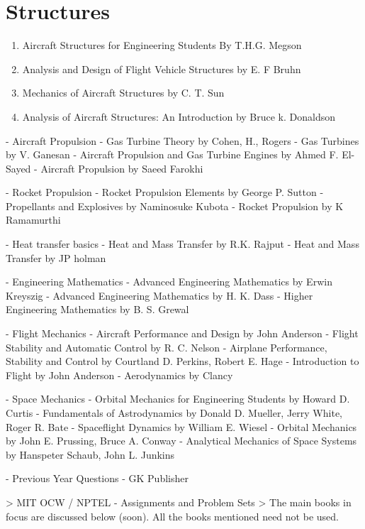 \section{Structures}
\begin{enumerate}
  \item Aircraft Structures for Engineering Students By T.H.G. Megson
  \item Analysis and Design of Flight Vehicle Structures by E. F Bruhn
  \item Mechanics of Aircraft Structures by C. T. Sun
  \item Analysis of Aircraft Structures: An Introduction by Bruce k. Donaldson
\end{enumerate}

- Aircraft Propulsion
- Gas Turbine Theory by Cohen, H., Rogers
- Gas Turbines by V. Ganesan
- Aircraft Propulsion and Gas Turbine Engines by Ahmed F. El-Sayed
- Aircraft Propulsion by Saeed Farokhi

- Rocket Propulsion
- Rocket Propulsion Elements by George P. Sutton
- Propellants and Explosives by Naminosuke Kubota
- Rocket Propulsion by K Ramamurthi

- Heat transfer basics
- Heat and Mass Transfer by R.K. Rajput
- Heat and Mass Transfer by JP holman

- Engineering Mathematics
- Advanced Engineering Mathematics by Erwin Kreyszig
- Advanced Engineering Mathematics by H. K. Dass
- Higher Engineering Mathematics by B. S. Grewal

- Flight Mechanics
- Aircraft Performance and Design by John Anderson
- Flight Stability and Automatic Control by R. C. Nelson
- Airplane Performance, Stability and Control by Courtland D. Perkins, Robert E. Hage
- Introduction to Flight by John Anderson
- Aerodynamics by Clancy

- Space Mechanics
- Orbital Mechanics for Engineering Students by Howard D. Curtis
- Fundamentals of Astrodynamics by Donald D. Mueller, Jerry White, Roger R. Bate
- Spaceflight Dynamics by William E. Wiesel
- Orbital Mechanics by John E. Prussing, Bruce A. Conway
- Analytical Mechanics of Space Systems by Hanspeter Schaub, John L. Junkins

- Previous Year Questions
- GK Publisher

> MIT OCW / NPTEL - Assignments and Problem Sets
> The main books in focus are discussed below (soon). All the books mentioned need not be used.
